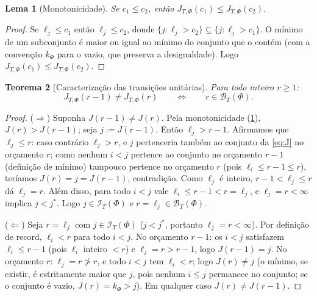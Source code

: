 \documentclass[11pt,a4paper]{article}
\newtheorem{theorem}{Teorema}[section]
\newtheorem{lemma}[theorem]{Lema}
\theoremstyle{definition}
\theoremstyle{remark}
\begin{document}
\begin{lemma}[Monotonicidade]\label{lem:monotonicidade}
Se $c_1 \leq c_2$, então $J_{T,\Phi}(c_1) \leq J_{T,\Phi}(c_2)$.
\end{lemma}

\begin{proof}
Se $\ell_j \leq c_1$ então $\ell_j \leq c_2$, donde
$\{ j : \ell_j > c_2 \} \subseteq \{ j : \ell_j > c_1 \}$. O mínimo de um
subconjunto é maior ou igual ao mínimo do conjunto que o contém (com a convenção
$k_\Phi$ para o vazio, que preserva a desigualdade). Logo
$J_{T,\Phi}(c_1) \leq J_{T,\Phi}(c_2)$.
\end{proof}

\begin{theorem}[Caracteriza\c{c}\~{a}o das transi\c{c}\~{o}es unit\'{a}rias]\label{thm:transicoes}
Para todo inteiro $r \geq 1$:
\begin{equation}\label{eq:62}
  J_{T,\Phi}(r-1) \neq J_{T,\Phi}(r) \qquad\iff\qquad r \in \mathcal{B}_T(\Phi).
\end{equation}
\end{theorem}

\begin{proof}
($\Rightarrow$) Suponha $J(r-1) \neq J(r)$. Pela monotonicidade
(\cref{lem:monotonicidade}), $J(r) > J(r-1)$; seja $j := J(r-1)$. Então
$\ell_j > r-1$. Afirmamos que $\ell_j \leq r$: caso contrário
$\ell_j > r$, e $j$ pertenceria também ao conjunto da \cref{eq:J} no orçamento
$r$; como nenhum $i < j$ pertence ao conjunto no orçamento $r-1$ (definição de
mínimo) tampouco pertence no orçamento $r$ (pois $\ell_i \leq r-1 \leq r$),
teríamos $J(r) = j = J(r-1)$, contradição. Como $\ell_j$ é inteiro,
$r-1 < \ell_j \leq r$ dá $\ell_j = r$. Além disso, para todo $i < j$ vale
$\ell_i \leq r-1 < r = \ell_j$, e $\ell_j = r < \infty$ implica $j < j^{*}$.
Logo $j \in \mathcal{I}_T(\Phi)$ e $r = \ell_j \in \mathcal{B}_T(\Phi)$.

($\Leftarrow$) Seja $r = \ell_j$ com $j \in \mathcal{I}_T(\Phi)$
($j < j^{*}$, portanto $\ell_j = r < \infty$). Por definição de record,
$\ell_i < r$ para todo $i < j$. No orçamento $r-1$: os $i < j$ satisfazem
$\ell_i \leq r-1$ (pois $\ell_i$ inteiro $< r$) e $\ell_j = r > r-1$, logo
$J(r-1) = j$. No orçamento $r$: $\ell_j = r \ngtr r$, e todo $i < j$ tem
$\ell_i < r$; logo $J(r) \neq j$ (o mínimo, se existir, é estritamente maior
que $j$, pois nenhum $i \leq j$ permanece no conjunto; se o conjunto é vazio,
$J(r) = k_\Phi > j$). Em qualquer caso $J(r) \neq J(r-1)$.
\end{proof}
\end{document}
